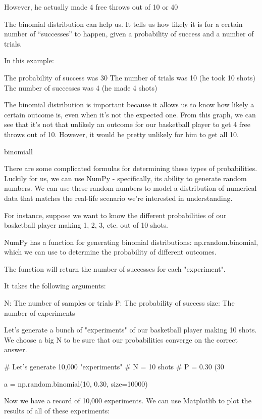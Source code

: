 \documentclass{journal}
\begin{document}
However, he actually made 4 free throws out of 10 or 40%

The binomial distribution can help us. It tells us how likely it is for a certain number of “successes” to happen, given a probability of success and a number of trials.

In this example:

    The probability of success was 30%
    The number of trials was 10 (he took 10 shots)
    The number of successes was 4 (he made 4 shots)

The binomial distribution is important because it allows us to know how likely a certain outcome is, even when it's not the expected one. From this graph, we can see that it's not that unlikely an outcome for our basketball player to get 4 free throws out of 10. However, it would be pretty unlikely for him to get all 10.

binomiall

There are some complicated formulas for determining these types of probabilities. Luckily for us, we can use NumPy - specifically, its ability to generate random numbers. We can use these random numbers to model a distribution of numerical data that matches the real-life scenario we're interested in understanding.

For instance, suppose we want to know the different probabilities of our basketball player making 1, 2, 3, etc. out of 10 shots.

NumPy has a function for generating binomial distributions: np.random.binomial, which we can use to determine the probability of different outcomes.

The function will return the number of successes for each "experiment".

It takes the following arguments:

    N: The number of samples or trials
    P: The probability of success
    size: The number of experiments

Let's generate a bunch of "experiments" of our basketball player making 10 shots. We choose a big N to be sure that our probabilities converge on the correct answer.

# Let's generate 10,000 "experiments"
# N = 10 shots
# P = 0.30 (30%

a = np.random.binomial(10, 0.30, size=10000)

Now we have a record of 10,000 experiments. We can use Matplotlib to plot the results of all of these experiments:
\end{document}
